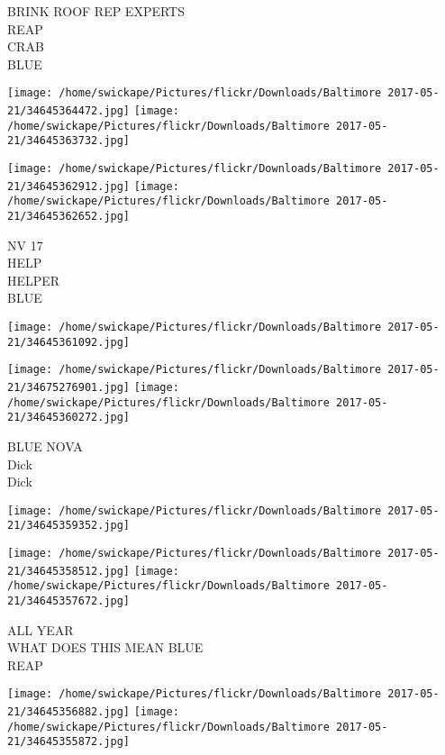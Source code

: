 \documentclass[10pt,letterpaper]{article}
\begin{document}
BRINK ROOF REP EXPERTS\\
REAP\\
CRAB\\
BLUE\\
\pagebreak

\texttt{[image: /home/swickape/Pictures/flickr/Downloads/Baltimore 2017-05-21/34645364472.jpg]}
\texttt{[image: /home/swickape/Pictures/flickr/Downloads/Baltimore 2017-05-21/34645363732.jpg]}

\texttt{[image: /home/swickape/Pictures/flickr/Downloads/Baltimore 2017-05-21/34645362912.jpg]}
\texttt{[image: /home/swickape/Pictures/flickr/Downloads/Baltimore 2017-05-21/34645362652.jpg]}

NV 17\\
HELP\\
HELPER\\
BLUE\\
\pagebreak

\texttt{[image: /home/swickape/Pictures/flickr/Downloads/Baltimore 2017-05-21/34645361092.jpg]}

\vspace{0.25in}
\texttt{[image: /home/swickape/Pictures/flickr/Downloads/Baltimore 2017-05-21/34675276901.jpg]}
\texttt{[image: /home/swickape/Pictures/flickr/Downloads/Baltimore 2017-05-21/34645360272.jpg]}

BLUE NOVA\\
Dick\\
Dick\\
\pagebreak

\texttt{[image: /home/swickape/Pictures/flickr/Downloads/Baltimore 2017-05-21/34645359352.jpg]}

\vspace{0.25in}
\texttt{[image: /home/swickape/Pictures/flickr/Downloads/Baltimore 2017-05-21/34645358512.jpg]}
\texttt{[image: /home/swickape/Pictures/flickr/Downloads/Baltimore 2017-05-21/34645357672.jpg]}

ALL YEAR\\
WHAT DOES THIS MEAN BLUE\\
REAP\\
\pagebreak

\texttt{[image: /home/swickape/Pictures/flickr/Downloads/Baltimore 2017-05-21/34645356882.jpg]}
\texttt{[image: /home/swickape/Pictures/flickr/Downloads/Baltimore 2017-05-21/34645355872.jpg]}
\end{document}
